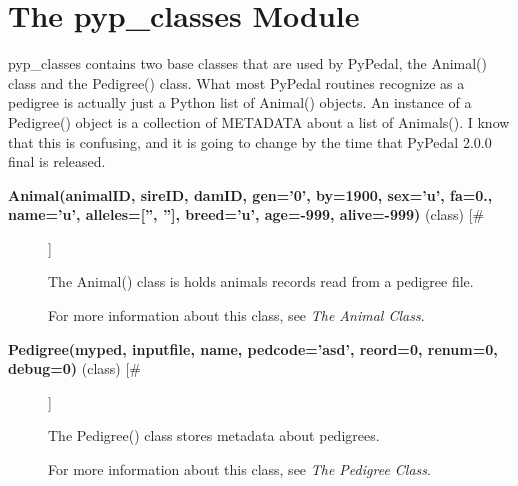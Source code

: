 \documentclass{article}
\begin{document}
\section*{The pyp\_classes Module}
\par pyp\_classes contains two base classes that are used by PyPedal, the Animal() class
and the Pedigree() class.  What most PyPedal routines recognize as a pedigree is
actually just a Python list of Animal() objects.  An instance of a Pedigree() object
is a collection of METADATA about a list of Animals().  I know that this is confusing,
and it is going to change by the time that PyPedal 2.0.0 final is released.
\begin{description}
\item[\textbf{Animal(animalID, sireID, damID, gen='0', by=1900, sex='u', fa=0., name='u', alleles=['', ''], breed='u', age=-999, alive=-999)} (class) [\#]
]
\par The Animal() class is holds animals records read from a pedigree file.
\par For more information about this class, see \textit{The Animal Class}.

\item[\textbf{Pedigree(myped, inputfile, name, pedcode='asd', reord=0, renum=0, debug=0)} (class) [\#]
]
\par The Pedigree() class stores metadata about pedigrees.
\par For more information about this class, see \textit{The Pedigree Class}.

\end{description}
\end{document}
